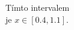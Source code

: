 \documentclass[preview]{standalone}
\begin{document}
\begin{center}
Tímto intervalem\\ je $x \in [0.4,1.1]$.
\end{center}
\end{document}
